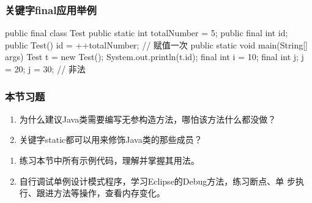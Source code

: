 \begin{frame}[fragile] %
\frametitle{关键字final应用举例}
\begin{javaCode}
public final class Test {
  public static int totalNumber = 5;
  public final int id;
  public Test() {
    id = ++totalNumber; // 赋值一次
  }
  public static void main(String[] args) {
    Test t = new Test();
    System.out.println(t.id);
    final int i = 10;
    final int j;
    j = 20;
    j = 30;  // 非法
  }
}
\end{javaCode}
\end{frame}
\begin{frame}
  \frametitle{本节习题}

  \begin{enumerate}
  \item 为什么建议Java类需要编写无参构造方法，哪怕该方法什么都没做？
  \item 关键字static都可以用来修饰Java类的那些成员？
  \end{enumerate}

  \begin{enumerate}
  \item 练习本节中所有示例代码，理解并掌握其用法。
  \item 自行调试单例设计模式程序，学习Eclipse的Debug方法，练习断点、单
    步执行、跟进方法等操作，查看内存变化。
  \end{enumerate}
\end{frame}


